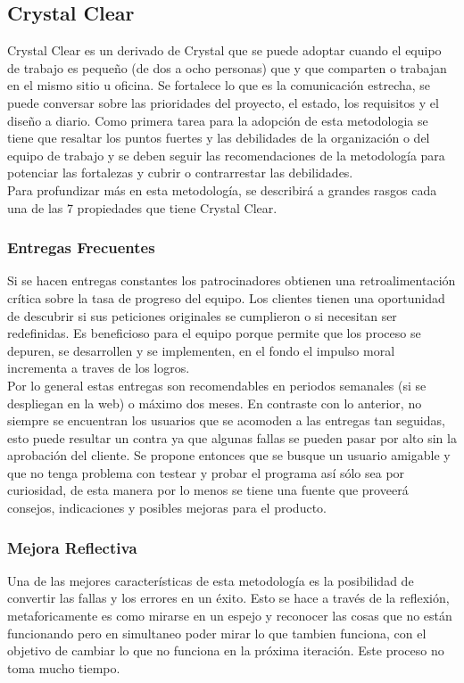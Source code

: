 \subsection{Crystal Clear}
Crystal Clear es un derivado de Crystal que se puede adoptar cuando el equipo de trabajo es pequeño (de dos a ocho personas) que y que comparten o trabajan en el mismo sitio u oficina. Se fortalece lo que es la comunicación estrecha, se puede conversar sobre las prioridades del proyecto, el estado, los requisitos y el diseño a diario. Como primera tarea para la adopción de esta metodologia se tiene que resaltar los puntos fuertes y las debilidades de la organización o del equipo de trabajo y se deben seguir las recomendaciones de la metodología para potenciar las fortalezas y cubrir o contrarrestar las debilidades. \\

Para profundizar más en esta metodología, se describirá a grandes rasgos cada una de las 7 propiedades que tiene Crystal Clear.

\subsubsection{Entregas Frecuentes}
Si se hacen entregas constantes los patrocinadores obtienen una retroalimentación crítica sobre la tasa de progreso del equipo. Los clientes tienen una oportunidad de descubrir si sus peticiones originales se cumplieron o si necesitan ser redefinidas. Es beneficioso para el equipo porque permite que los proceso se depuren, se desarrollen y se implementen, en el fondo el impulso moral incrementa a traves de los logros.\\

Por lo general estas entregas son recomendables en periodos semanales (si se despliegan en la web) o máximo dos meses. En contraste con lo anterior, no siempre se encuentran los usuarios que se acomoden a las entregas tan seguidas, esto puede resultar un contra ya que algunas fallas se pueden pasar por alto sin la aprobación del cliente. Se propone entonces que se busque un usuario amigable y que no tenga problema con testear y probar el programa así sólo sea por curiosidad, de esta manera por lo menos se tiene una fuente que proveerá consejos, indicaciones y posibles mejoras para el producto.

\subsubsection{Mejora Reflectiva}
Una de las mejores características de esta metodología es la posibilidad de convertir las fallas y los errores en un éxito. Esto se hace a través de la reflexión, metaforicamente es como mirarse en un espejo y reconocer las cosas que no están funcionando pero en simultaneo poder mirar lo que tambien funciona, con el objetivo de cambiar lo que no funciona en la próxima iteración. Este proceso no toma mucho tiempo.\\

